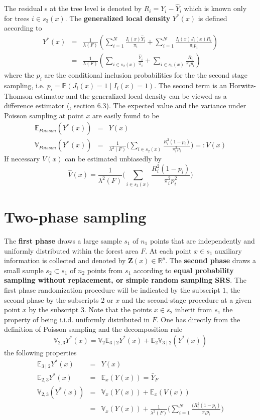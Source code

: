 \documentclass[a4paper,12pt,leqno, titlepage]{article}
\newcommand{\LF}{\ensuremath{\lambda(F)}}
\newcommand{\LFC}{\ensuremath{\lambda^2(F)}}
\newcommand{\EX}{\mathbb{E}}
\newcommand{\PR}{\mathbb{P}}
\newcommand{\VAR}{\mathbb{V}}
\newcommand{\RE}{\mathbb{R}}
\begin{document}
 The residual s at the tree level is denoted by $R_i=Y_i-\hat{Y}_i$ which is known only for trees
 $i\in{s_{3}(x)}$. The \textbf{generalized local density} $Y^*(x)$ is defined
 according to
 \begin{eqnarray}\label{gdens}
 Y^*(x)&=&\frac{1}{\LF}\left( \sum_{i=1}^N \frac{I_{i}(x)\hat{Y}_i}{\pi_i} +
 \sum_{i=1}^N \frac{I_{i}(x)J_{i}(x)R_i}{\pi_{i}p_i}\right)\nonumber \\
 &=&\frac{1}{\LF}\left( \sum_{i\in{s_{2}(x)}} \frac{\hat{Y}_i}{\pi_i}
 +\sum_{i\in{s_{3}(x)}} \frac{R_i}{\pi_{i}p_i}\right)
 \end{eqnarray}
 where the $p_i$ are the conditional inclusion probabilities for the the second stage sampling, i.e. $p_i=\PR(J_i(x)=1 \mid I_i(x)=1)$. The second term is an Horwitz-Thomson estimator and the generalized local density can be viewed as a difference estimator (\cite{sarndal}, section 6.3). The expected value and the variance under Poisson sampling at point $x$ are easily found to be
 \begin{eqnarray}\label{poisson_atx}
  \EX_{Poisson}(Y^*(x)) &=& Y(x) \nonumber \\
  \VAR_{Poisson}(Y^*(x))&=&\frac{1}{\LFC}\big(\sum_{i\in{s_{2}(x)}} \frac{R_i^2(1-p_i)}{\pi_i^{2}p_i} \big)=:V(x)
 \end{eqnarray}
If necessary $V(x)$ can be estimated unbiasedly by
\begin{equation}\label{estvarvofx}
\hat{V}(x)=\frac{1}{\LFC}\big(\sum_{i\in{s_{3}(x)}} \frac{R_i^2(1-p_i)}{\pi^2_ip^2_i}\big)
\end{equation}
\clearpage \newpage

\section{Two-phase sampling}\label{twophase}
 The \textbf{first phase} draws a large sample $s_1$ of $n_1$ points that are independently and uniformly distributed within the forest area $F$. At each point $x\in{s}_1$ auxiliary
information is collected and denoted by $\mathbf{Z}(x)\in{\RE ^{p}}$. The \textbf{second phase} draws a small sample $s_2\subset{s_1}$ of
$n_2$ points from $s_1$ according to \textbf{equal probability
sampling without replacement, or simple random sampling SRS}.
 The first phase randomization procedure will be indicated by the subscript $1$, the second phase by the subscripts $2$ or $x$ and the second-stage procedure at a given point $x$ by the subscript $3$. Note that the points $x\in{s_2}$ inherit from $s_1$ the property of being i.i.d. uniformly distributed in $F$. One has directly from the definition of Poisson sampling and the decomposition rule
 $$\VAR_{2,3}Y^*(x)=\VAR_2 \EX_{3 \mid 2}Y^*(x) + \EX_2 \VAR_{3 \mid 2}(Y^*(x))$$
 the following properties
 \begin{eqnarray}\label{twostage}
 \EX_{3\mid 2} Y^*(x)&=& Y(x)\nonumber \nonumber \\
 \EX_{2,3}Y^*(x)&=&\EX_x(Y(x))=\bar{Y}_F \nonumber \\
 \VAR_{2,3}(Y^*(x))&=&\VAR_x(Y(x)) + \EX_x(V(x)) \nonumber \\
 &=&\VAR_x(Y(x))+\frac{1}{\LFC}\Big(\sum_{i=1}^N\frac{(R_i^2(1-p_i)}{\pi_ip_i}\Big)
 \end{eqnarray}
\end{document}
